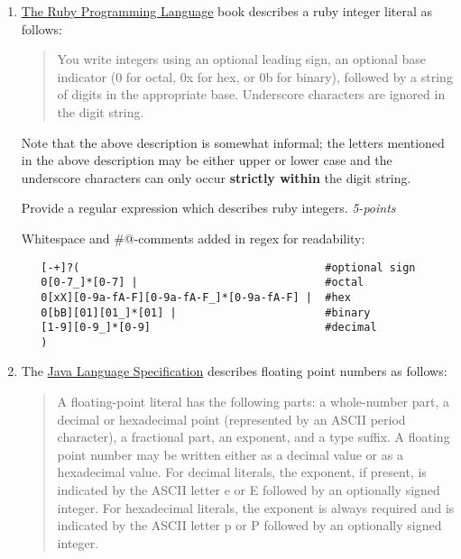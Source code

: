 \documentclass[12pt]{article}
\begin{document}
\begin{enumerate}

\item \href{http://ruby-doc.com/docs/ProgrammingRuby/}{The Ruby
  Programming Language} book describes a ruby integer literal as follows:

  \begin{quote}
    You write integers using an optional leading sign, an optional base indicator (0 for octal, 0x for hex, or 0b for binary), followed by a string of digits in the appropriate base. Underscore characters are ignored in the digit string. 
  \end{quote}

  Note that the above description is somewhat informal; the letters
  mentioned in the above description may be either upper or lower
  case and the underscore characters can only occur \textbf{strictly within}
  the digit string.

  Provide a regular expression which describes ruby integers. \hfill\textit{5-points}

Whitespace and \verb@#@-comments added in regex for readability:
  
\begin{verbatim}
   [-+]?(                                      #optional sign
   0[0-7_]*[0-7] |                             #octal
   0[xX][0-9a-fA-F][0-9a-fA-F_]*[0-9a-fA-F] |  #hex
   0[bB][01][01_]*[01] |                       #binary
   [1-9][0-9_]*[0-9]                           #decimal
   )                          
\end{verbatim}

\item The \href{https://docs.oracle.com/javase/specs/jls/se6/html/lexical.html#3.10.2}{Java Language Specification} describes floating point numbers as
  follows:

  \begin{quote}

    A floating-point literal has the following parts: a whole-number
    part, a decimal or hexadecimal point (represented by an ASCII
    period character), a fractional part, an exponent, and a type
    suffix. A floating point number may be written either as a decimal
    value or as a hexadecimal value. For decimal literals, the
    exponent, if present, is indicated by the ASCII letter e or E
    followed by an optionally signed integer. For hexadecimal
    literals, the exponent is always required and is indicated by the
    ASCII letter p or P followed by an optionally signed integer.


\end{quote}
\end{enumerate}
\end{document}

